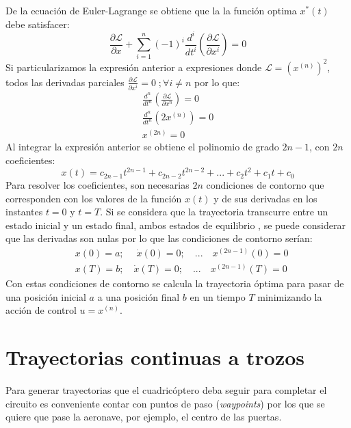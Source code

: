 De la  ecuación de Euler-Lagrange se obtiene que la la función optima $x^*(t)$ debe satisfacer:
\begin{equation}
	\frac{\partial\mathcal{L}}{\partial x} + \sum_{i=1}^{n}(-1)^i \frac{d^i}{dt^i}\left(\frac{\partial\mathcal{L}}{\partial x^i}\right)  = 0
\end{equation}
Si particularizamos la expresión anterior a expresiones donde $\mathcal{L} =\left(x^{(n)}\right)^2$, todos las derivadas parciales $\frac{\partial\mathcal{L}}{\partial x^i} = 0 \; ; \forall i \neq n$ por lo que:
\begin{align}
	\frac{d^n}{dt^n}\left(\frac{\partial\mathcal{L}}{\partial x^n}\right) = 0 \\
	\frac{d^n}{dt^n}\left(2 x^{(n)}\right) = 0\\
	x^{(2n)} = 0
\end{align}
Al integrar la expresión anterior se obtiene el polinomio de grado $2n-1$, con $2n$ coeficientes:
\begin{equation}
	x(t) = c_{2n-1}t^{2n-1} + c_{2n-2}t^{2n-2} + ... + c_2t^2 + c_1t + c_0
\end{equation}
Para resolver los coeficientes, son necesarias $2n$ condiciones de contorno que corresponden con los valores de la función $x(t)$ y de sus derivadas en los instantes $t=0$ y $t = T$. Si se considera que la trayectoria transcurre entre un estado inicial y un estado final, ambos estados de equilibrio , se puede considerar que las derivadas son nulas por lo que las condiciones de contorno serían:
\begin{align}
 	&x(0) = a; \quad \;\dot{x}(0) = 0;  \quad...\quad x^{(2n-1)}(0) = 0\\
	&x(T) = b;\quad \dot{x}(T) = 0;  \quad...\quad x^{(2n-1)}(T) = 0
\end{align}
Con estas condiciones de contorno se calcula la trayectoria óptima para pasar de una posición inicial $a$ a una posición final $b$ en un tiempo $T$ minimizando la acción de control $u = x^{(n)}$. 



\section{Trayectorias continuas a trozos}
Para generar trayectorias que el cuadricóptero deba seguir para completar el circuito es conveniente contar con puntos de paso (\textit{waypoints}) por los que se quiere que pase la aeronave, por ejemplo, el centro de las puertas.


